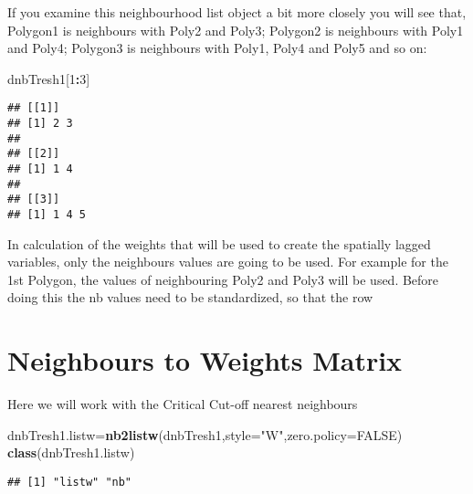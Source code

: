\documentclass[
]{book}
\newenvironment{Shaded}{\begin{snugshade}}{\end{snugshade}}
\newcommand{\DataTypeTok}[1]{\textcolor[rgb]{0.13,0.29,0.53}{#1}}
\newcommand{\DecValTok}[1]{\textcolor[rgb]{0.00,0.00,0.81}{#1}}
\newcommand{\KeywordTok}[1]{\textcolor[rgb]{0.13,0.29,0.53}{\textbf{#1}}}
\newcommand{\NormalTok}[1]{#1}
\newcommand{\OperatorTok}[1]{\textcolor[rgb]{0.81,0.36,0.00}{\textbf{#1}}}
\newcommand{\OtherTok}[1]{\textcolor[rgb]{0.56,0.35,0.01}{#1}}
\newcommand{\StringTok}[1]{\textcolor[rgb]{0.31,0.60,0.02}{#1}}
\begin{document}
If you examine this neighbourhood list object a bit more closely you will see that, Polygon1 is neighbours with Poly2 and Poly3; Polygon2 is neighbours with Poly1 and Poly4; Polygon3 is neighbours with Poly1, Poly4 and Poly5 and so on:

\begin{Shaded}
\begin{Highlighting}[]
\NormalTok{dnbTresh1[}\DecValTok{1}\OperatorTok{:}\DecValTok{3}\NormalTok{]}
\end{Highlighting}
\end{Shaded}

\begin{verbatim}
## [[1]]
## [1] 2 3
## 
## [[2]]
## [1] 1 4
## 
## [[3]]
## [1] 1 4 5
\end{verbatim}

In calculation of the weights that will be used to create the spatially lagged variables, only the neighbours values are going to be used. For example for the 1st Polygon, the values of neighbouring Poly2 and Poly3 will be used. Before doing this the nb values need to be standardized, so that the row

\hypertarget{neighbours-to-weights-matrix}{%
\section{Neighbours to Weights Matrix}\label{neighbours-to-weights-matrix}}

Here we will work with the Critical Cut-off nearest neighbours

\begin{Shaded}
\begin{Highlighting}[]
\NormalTok{dnbTresh1.listw=}\KeywordTok{nb2listw}\NormalTok{(dnbTresh1,}\DataTypeTok{style=}\StringTok{"W"}\NormalTok{,}\DataTypeTok{zero.policy=}\OtherTok{FALSE}\NormalTok{)}
\KeywordTok{class}\NormalTok{(dnbTresh1.listw)}
\end{Highlighting}
\end{Shaded}

\begin{verbatim}
## [1] "listw" "nb"
\end{verbatim}

\begin{Shaded}
\end{Shaded}
\end{document}

